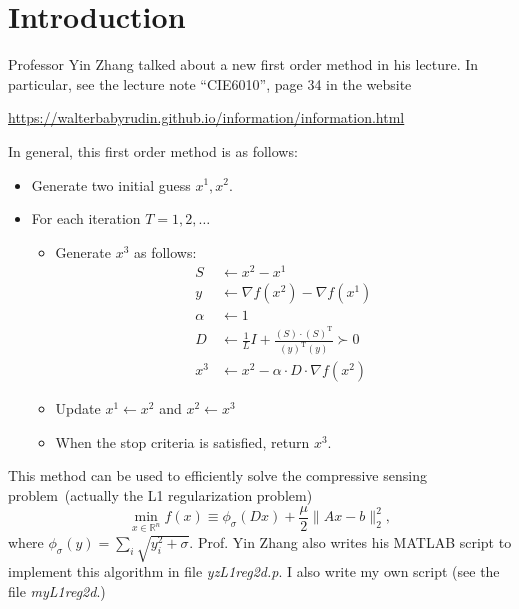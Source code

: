 \documentclass[11pt]{article}
\newcommand{\trans}{^{\mathrm T}}
\begin{document}
\section{Introduction}
Professor Yin Zhang talked about a new first order method in his lecture. In particular, see the lecture note ``CIE6010'', page 34 in the website
\begin{center}
\url{
https://walterbabyrudin.github.io/information/information.html
}
\end{center}
In general, this first order method is as follows:
\begin{itemize}
\item
Generate two initial guess $x^1,x^2$.
\item
For each iteration $T=1,2,\dots$
\begin{itemize}
\item
Generate $x^3$ as follows:
\begin{align*}
S&\leftarrow x^{2} - x^1\\
y&\leftarrow\nabla f(x^{2}) - \nabla f(x^1)\\
\alpha&\leftarrow1\\
D &\leftarrow \frac{1}{L}I + \frac{(S)\cdot (S)\trans}{(y)\trans(y)}\succ0\\
x^3&\leftarrow x^{2} - \alpha \cdot D \cdot \nabla f(x^{2})
\end{align*}
\item
Update $x^1\leftarrow x^2$ and $x^2\leftarrow x^3$
\item
When the stop criteria is satisfied, return $x^3$.
\end{itemize}
\end{itemize}
This method can be used to efficiently solve the compressive sensing problem~(actually the L1 regularization problem)
\[
\min_{x\in\mathbb{R}^n}f(x)\equiv \phi_{\sigma}(Dx)+\frac{\mu}{2}\|Ax-b\|_2^2,
\]
where $\phi_{\sigma}(y)=\sum_i\sqrt{y_i^2+\sigma}$.
Prof. Yin Zhang also writes his MATLAB script to implement this algorithm in file \textit{yzL1reg2d.p}.
I also write my own script (see the file \textit{myL1reg2d}.)
%
%
\end{document}
